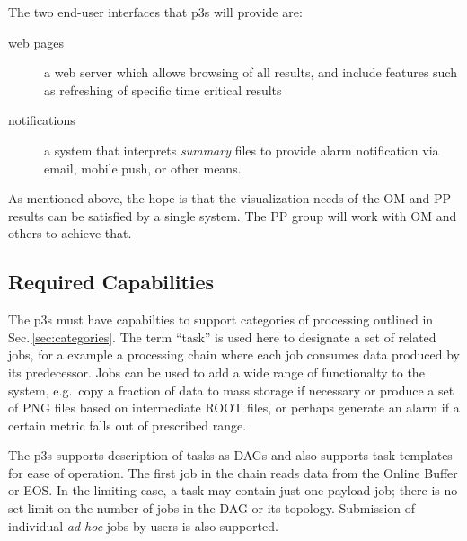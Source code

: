 \documentclass[pdftex,12pt,letter]{article}
\begin{document}
\noindent The two end-user interfaces that p3s will provide are:

\begin{description}
\item[web pages] a web server which allows browsing of all results, and include features such as refreshing of specific time critical results
\item[notifications] a system that interprets \textit{summary} files to provide alarm notification via email, mobile push, or other means.
\end{description}

\noindent As mentioned above, the hope is that the visualization needs
of the OM and PP results can be satisfied by a single system.  The PP
group will work with OM and others to achieve that.


\subsection{Required Capabilities}
\label{sec:capabilities}

The p3s must have capabilties to support categories of processing outlined
in Sec.\,\ref{sec:categories}. The term ``task'' is used here to designate a set
of related jobs, for a example a processing chain where each job consumes
data produced by its predecessor. Jobs can be used to add a wide range
of functionalty to the system, e.g.~copy a fraction of data to mass storage
if necessary or produce a set of PNG files based on intermediate ROOT files,
or perhaps generate an alarm if a certain metric falls out of prescribed range.

The p3s supports description of tasks as DAGs and also supports task templates
for ease of operation. The first job in the chain reads data from
the Online Buffer or EOS. In the limiting case, a task may contain just one payload
job; there is no set limit on the number of jobs in the DAG or its topology.
Submission of individual \textit{ad hoc} jobs by users is also supported.
\end{document}
